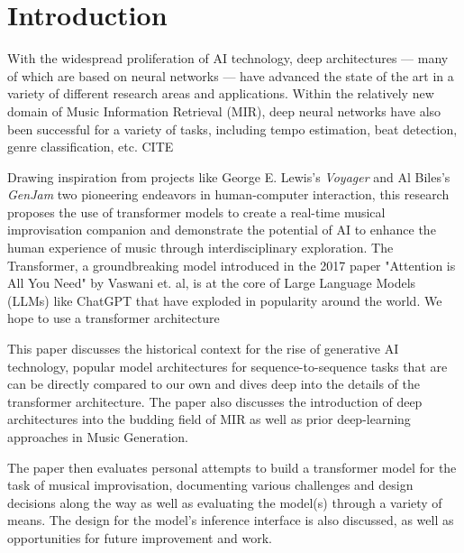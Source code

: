 \documentclass[../main.tex]{subfiles}
\begin{document}
\newpage

\chapter{Introduction}

With the widespread proliferation of AI technology, deep architectures — many of which are based on neural networks — have advanced the state of the art in a variety of different research areas and applications. Within the relatively new domain of Music Information Retrieval (MIR), deep neural networks have also been successful for a variety of tasks, including tempo estimation, beat detection, genre classification, etc. {CITE}

Drawing inspiration from projects like George E. Lewis's \textit{Voyager}\cite{Lewis:1} and Al Biles's \textit{GenJam}\cite{Biles:1} two pioneering endeavors in human-computer interaction, this research proposes the use of transformer models to create a real-time musical improvisation companion and demonstrate the potential of AI to enhance the human experience of music through interdisciplinary exploration. The Transformer, a groundbreaking model introduced in the 2017 paper "Attention is All You Need" by Vaswani et. al, \cite{Vaswani:1} is at the core of Large Language Models (LLMs) like ChatGPT that have exploded in popularity around the world. We hope to use a transformer architecture 

This paper discusses the historical context for the rise of generative AI technology, popular model architectures for sequence-to-sequence tasks that are can be directly compared to our own and dives deep into the details of the transformer architecture. The paper also discusses the introduction of deep architectures into the budding field of MIR as well as prior deep-learning approaches in Music Generation.
 
The paper then evaluates personal attempts to build a transformer model for the task of musical improvisation, documenting various challenges and design decisions along the way as well as evaluating the model(s) through a variety of means. The design for the model's inference interface is also discussed, as well as opportunities for future improvement and work.
\end{document}
